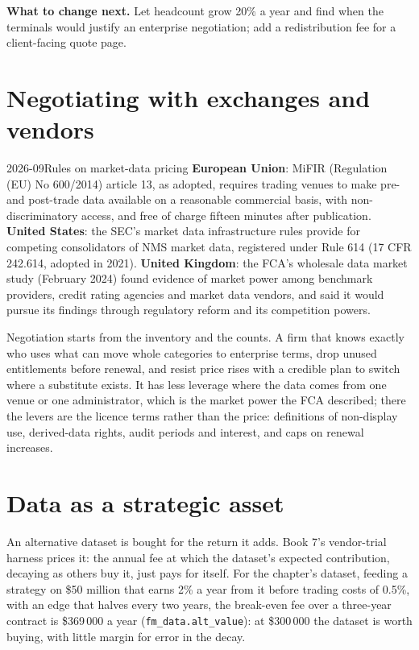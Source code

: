 \textbf{What to change next.} Let headcount grow 20\% a year and find when the terminals would justify an enterprise negotiation; add a
redistribution fee for a client-facing quote page.

\section{Negotiating with exchanges and vendors}

\begin{dated}{2026-09}{Rules on market-data pricing}\label{dat:fm:data-strategy-and-costs:rules}
\textbf{European Union}: MiFIR (Regulation (EU) No 600/2014) article 13, as adopted, requires trading venues to make pre- and post-trade data
available on a reasonable commercial basis, with non-discriminatory access, and free of charge fifteen minutes after publication. \textbf{United
States}: the SEC's market data infrastructure rules provide for competing consolidators of NMS market data, registered under Rule 614 (17 CFR
242.614, adopted in 2021). \textbf{United Kingdom}: the FCA's wholesale data market study (February 2024) found evidence of market power among
benchmark providers, credit rating agencies and market data vendors, and said it would pursue its findings through regulatory reform and its
competition powers.
\end{dated}

Negotiation starts from the inventory and the counts. A firm that knows exactly who uses what can move whole categories to enterprise terms, drop
unused entitlements before renewal, and resist price rises with a credible plan to switch where a substitute exists. It has less leverage where the
data comes from one venue or one administrator, which is the market power the FCA described; there the levers are the licence terms rather than
the price: definitions of non-display use, derived-data rights, audit periods and interest, and caps on renewal increases.

\section{Data as a strategic asset}

An alternative dataset is bought for the return it adds. Book 7's vendor-trial harness prices it: the annual fee at which the dataset's expected
contribution, decaying as others buy it, just pays for itself. For the chapter's dataset, feeding a strategy on \$50 million that earns 2\% a year
from it before trading costs of 0.5\%, with an edge that halves every two years, the break-even fee over a three-year contract is \$369\,000 a year
(\texttt{fm\_data.alt\_value}): at \$300\,000 the dataset is worth buying, with little margin for error in the decay.

